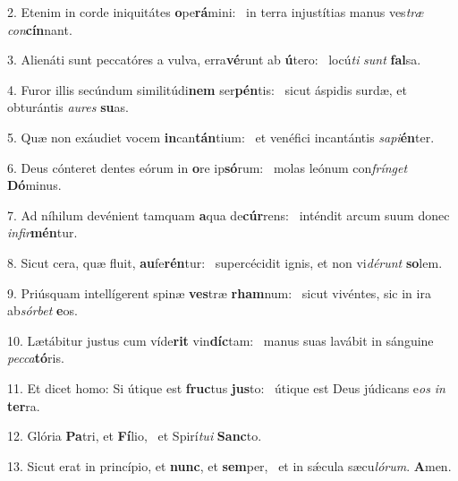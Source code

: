 2. Etenim in corde iniquitátes \textbf{o}pe\textbf{rá}mini: \ast\  in terra injustítias manus ves\textit{træ} \textit{con}\textbf{cín}nant.\

3. Alienáti sunt peccatóres a vulva, erra\textbf{vé}runt ab \textbf{ú}tero: \ast\  locú\textit{ti} \textit{sunt} \textbf{fal}sa.\

4. Furor illis secúndum similitúdi\textbf{nem} ser\textbf{pén}tis: \ast\  sicut áspidis surdæ, et obturántis \textit{au}\textit{res} \textbf{su}as.\

5. Quæ non exáudiet vocem \textbf{in}can\textbf{tán}tium: \ast\  et venéfici incantántis \textit{sa}\textit{pi}\textbf{én}ter.\

6. Deus cónteret dentes eórum in \textbf{o}re ip\textbf{só}rum: \ast\  molas leónum con\textit{frín}\textit{get} \textbf{Dó}minus.\

7. Ad níhilum devénient tamquam \textbf{a}qua de\textbf{cúr}rens: \ast\  inténdit arcum suum donec \textit{in}\textit{fir}\textbf{mén}tur.\

8. Sicut cera, quæ fluit, \textbf{au}fe\textbf{rén}tur: \ast\  supercécidit ignis, et non vi\textit{dé}\textit{runt} \textbf{so}lem.\

9. Priúsquam intellígerent spinæ \textbf{ves}træ \textbf{rham}num: \ast\  sicut vivéntes, sic in ira ab\textit{sór}\textit{bet} \textbf{e}os.\

10. Lætábitur justus cum víde\textbf{rit} vin\textbf{díc}tam: \ast\  manus suas lavábit in sánguine \textit{pec}\textit{ca}\textbf{tó}ris.\

11. Et dicet homo: Si útique est \textbf{fruc}tus \textbf{jus}to: \ast\  útique est Deus júdicans e\textit{os} \textit{in} \textbf{ter}ra.\

12. Glória \textbf{Pa}tri, et \textbf{Fí}lio, \ast\  et Spirí\textit{tu}\textit{i} \textbf{Sanc}to.\

13. Sicut erat in princípio, et \textbf{nunc}, et \textbf{sem}per, \ast\  et in sǽcula sæcu\textit{ló}\textit{rum}. \textbf{A}men.\

